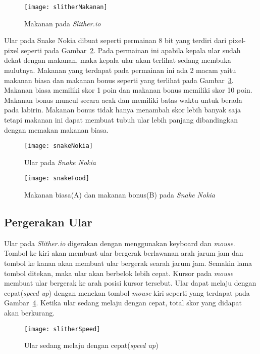 \begin{figure}[H]
	\centering  
	\texttt{[image: slitherMakanan]}  
	\caption[Makanan pada \textit{Slither.io}]{Makanan pada \textit{Slither.io}}
	\label{fig:slitherMakanan} 
\end{figure}

Ular pada Snake Nokia dibuat seperti permainan 8 bit yang terdiri dari pixel-pixel seperti pada Gambar~\ref{fig:snakeNokia}. Pada permainan ini apabila kepala ular sudah dekat dengan makanan, maka kepala ular akan terlihat sedang membuka mulutnya. Makanan yang terdapat pada permainan ini ada 2 macam yaitu makanan biasa dan makanan bonus seperti yang terlihat pada Gambar~\ref{fig:snakeFood}. Makanan biasa memiliki skor 1 poin dan makanan bonus memiliki skor 10 poin. Makanan bonus muncul secara acak dan memiliki batas waktu untuk berada pada labirin. Makanan bonus tidak hanya menambah skor lebih banyak saja tetapi makanan ini dapat membuat tubuh ular lebih panjang dibandingkan dengan memakan makanan biasa.

\begin{figure}[H]
	\centering  
	\texttt{[image: snakeNokia]}  
	\caption[Ular pada \textit{Snake Nokia}]{Ular pada \textit{Snake Nokia}}
	\label{fig:snakeNokia} 
\end{figure}

\begin{figure}[H]
	\centering  
	\texttt{[image: snakeFood]}  
	\caption[Makanan biasa(A) dan makanan bonus(B) pada \textit{Snake Nokia}]{Makanan biasa(A) dan makanan bonus(B) pada \textit{Snake Nokia}}
	\label{fig:snakeFood} 
\end{figure}

\subsection{Pergerakan Ular}
Ular pada \textit{Slither.io} digerakan dengan menggunakan keyboard dan \textit{mouse}. Tombol ke kiri akan membuat ular bergerak berlawanan arah jarum jam dan tombol ke kanan akan membuat ular bergerak searah jarum jam. Semakin lama tombol ditekan, maka ular akan berbelok lebih cepat. Kursor pada \textit{mouse} membuat ular bergerak ke arah posisi kursor tersebut. Ular dapat melaju dengan cepat(\textit{speed up}) dengan menekan tombol \textit{mouse} kiri seperti yang terdapat pada Gambar~\ref{fig:slitherSpeed}. Ketika ular sedang melaju dengan cepat, total skor yang didapat akan berkurang. 

\begin{figure}[H]
	\centering  
	\texttt{[image: slitherSpeed]}  
	\caption[Ular sedang melaju dengan cepat(\textit{speed up})]{Ular sedang melaju dengan cepat(\textit{speed up})}
	\label{fig:slitherSpeed} 
\end{figure}

